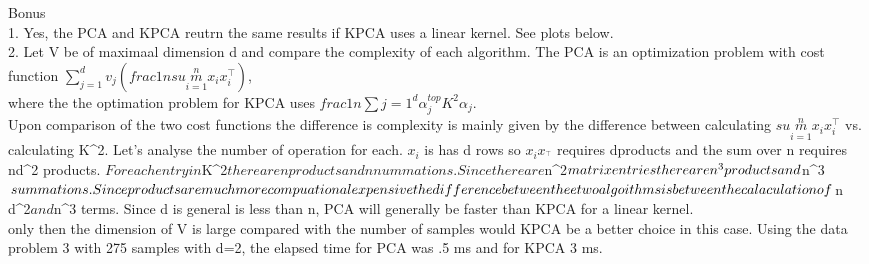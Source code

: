 

Bonus\\
\vspace{.4cm}
1. Yes, the PCA and KPCA reutrn the same results if KPCA uses a linear kernel. See plots below.\\
\vspace{.4cm}
2. Let V be of maximaal dimension d and compare the complexity of each algorithm.
\vspace{.4cm}
The PCA is an optimization problem with cost function $\sum\limits_{j=1}^d v_j (frac{1}{n}sum\limits_{i=1}^n x_i x_i^{\top})$,\\
where the the optimation problem for KPCA uses $frac{1}{n}\sum\limits{j=1}^d \alpha_j^{top} K^2 \alpha_j$.\\
\vspace{.4cm}
Upon comparison of the two cost functions the difference is complexity is mainly given by the difference between
calculating $sum\limits_{i=1}^n x_i x_i^{\top}$ vs. calculating K^2. Let's analyse the number of operation for each.
\vspace{.4cm}
$x_i$ is has d rows so $x_i x_^{\top}$ requires d\timesd products and the sum over n requires n\timees d^2 products.
$For each entry in $K^2$ there are n products and n nummations. Since there are $n^2$ matrix entries there are n^3 products\\
and $n^3$ summations.
\vspace{.4cm}
Since products are much more compuational expensive the difference between thee two algoithms is between the calaculation of\\
$n \times d^2$ and $n^3 terms. Since d is general is less than n, PCA will generally be faster than KPCA for a linear kernel.\\
only then the dimension of V is large compared with the number of samples would KPCA be a better choice in this case.
Using the data problem 3 with 275 samples with d=2, the elapsed time for PCA was .5 ms and for KPCA 3 ms.

